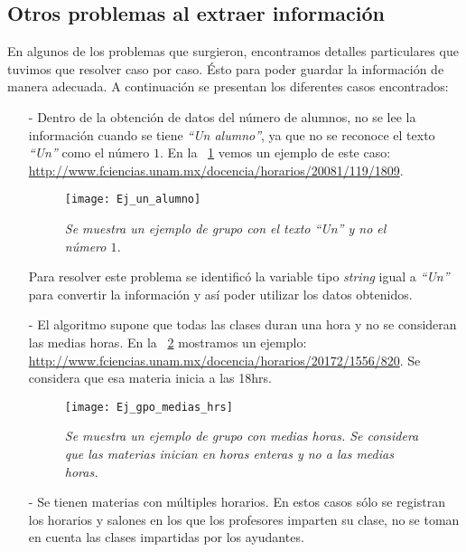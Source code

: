 \subsection{Otros problemas al extraer información}

En algunos de los problemas que surgieron, encontramos detalles particulares que tuvimos que resolver caso por caso. Ésto para poder guardar la información de manera adecuada. A continuación se presentan los diferentes casos encontrados:
  
  \begin{itemize}
\item[-] Dentro de la obtención de datos del número de alumnos, no se lee la información cuando se tiene \textit{``Un alumno''}, ya que no se reconoce el texto \textit{``Un''} como el número $1$. En la \figurename{~\ref{UnAlumno}} vemos un ejemplo de este caso: \url{http://www.fciencias.unam.mx/docencia/horarios/20081/119/1809}.

\begin{figure}[H]
\centering
\texttt{[image: Ej\_un\_alumno]} %
\caption[\textit{Grupo con un alumno}]{\textit{Se muestra un ejemplo de grupo con el texto ``Un'' y no el número $1$.}}\label{UnAlumno}
\end{figure}

Para resolver este problema se identificó la variable tipo \textit{string} igual a \textit{``Un''} para convertir la información y así poder utilizar los datos obtenidos.

\item[-] El algoritmo supone que todas las clases duran una hora y no se consideran las medias horas. En la \figurename{~\ref{MediasHoras}} mostramos un ejemplo: \url{http://www.fciencias.unam.mx/docencia/horarios/20172/1556/820}. Se considera que esa materia inicia a las 18hrs.

\begin{figure}[H]
\centering
\texttt{[image: Ej\_gpo\_medias\_hrs]} %
\caption[\textit{Grupo con medias horas}]{\textit{Se muestra un ejemplo de grupo con medias horas. Se considera que las materias inician en horas enteras y no a las medias horas.}}\label{MediasHoras}
\end{figure}

\item[-] Se tienen materias con múltiples horarios. En estos casos sólo se registran los horarios y salones en los que los profesores imparten su clase, no se toman en cuenta las clases impartidas por los ayudantes.


\end{itemize}
